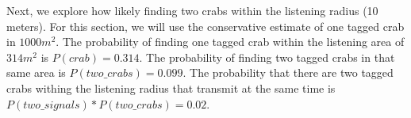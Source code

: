 \documentclass{article}
\begin{document}
Next, we explore how likely finding two crabs within the listening radius (10 meters). For this section, we will use the conservative estimate of one tagged crab in $1000m^2$. The probability of finding one tagged crab within the listening area of $314m^2$ is $P(crab)=0.314$. The probability of finding two tagged crabs in that same area is $P(two\_crabs)=0.099$. The probability that there are two tagged crabs withing the listening radius that transmit at the same time is $P(two\_signals)*P(two\_crabs)=0.02$. 

\end{document}
